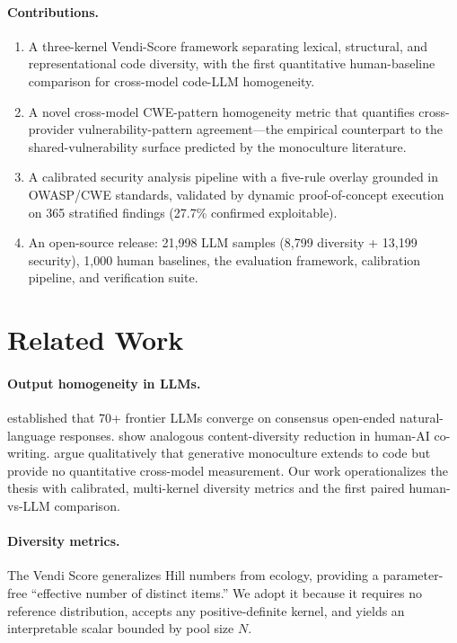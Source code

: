 \documentclass{article}
\begin{document}
\paragraph{Contributions.}
\begin{enumerate}[leftmargin=*]
  \item A three-kernel Vendi-Score framework separating lexical, structural,
    and representational code diversity, with the first quantitative
    human-baseline comparison for cross-model code-LLM homogeneity.
  \item A novel cross-model CWE-pattern homogeneity metric that quantifies
    cross-provider vulnerability-pattern agreement---the empirical
    counterpart to the shared-vulnerability surface predicted by the
    monoculture literature.
  \item A calibrated security analysis pipeline with a five-rule overlay
    grounded in OWASP/CWE standards, validated by dynamic proof-of-concept
    execution on 365 stratified findings (27.7\% confirmed exploitable).
  \item An open-source release: 21,998 LLM samples (8,799 diversity +
    13,199 security), 1,000 human baselines, the evaluation framework,
    calibration pipeline, and verification suite.
\end{enumerate}

\section{Related Work}
\label{sec:related}

\paragraph{Output homogeneity in LLMs.}
\citet{jiang2025hivemind} established that 70+ frontier LLMs converge on
consensus open-ended natural-language responses. \citet{padmakumar2024writing}
show analogous content-diversity reduction in human-AI co-writing.
\citet{wu2024monoculture} argue qualitatively that generative monoculture
extends to code but provide no quantitative cross-model measurement. Our
work operationalizes the \citeauthor{wu2024monoculture} thesis with
calibrated, multi-kernel diversity metrics and the first paired
human-vs-LLM comparison.

\paragraph{Diversity metrics.}
The Vendi Score \citep{friedman2023vendi} generalizes Hill numbers from
ecology, providing a parameter-free ``effective number of distinct items.''
We adopt it because it requires no reference distribution, accepts any
positive-definite kernel, and yields an interpretable scalar bounded by pool
size $N$.
\end{document}
